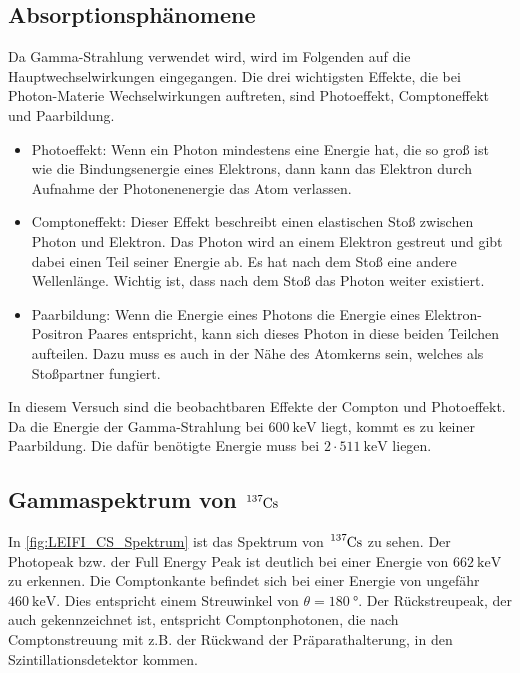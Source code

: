 \subsection{Absorptionsphänomene}
Da Gamma-Strahlung verwendet wird, wird im Folgenden auf die Hauptwechselwirkungen eingegangen.
Die drei wichtigsten Effekte, die bei Photon-Materie Wechselwirkungen auftreten, sind Photoeffekt, Comptoneffekt und Paarbildung.
\begin{itemize}
    \item   Photoeffekt: Wenn ein Photon mindestens eine Energie hat, die so groß ist wie die Bindungsenergie eines Elektrons, dann kann das Elektron durch Aufnahme der Photonenenergie das Atom verlassen.
    
    \item   Comptoneffekt: Dieser Effekt beschreibt einen elastischen Stoß zwischen Photon und Elektron.
            Das Photon wird an einem Elektron gestreut und gibt dabei einen Teil seiner Energie ab.
            Es hat nach dem Stoß eine andere Wellenlänge. Wichtig ist, dass nach dem Stoß das Photon weiter existiert.
    
    \item   Paarbildung: Wenn die Energie eines Photons die Energie eines Elektron-Positron Paares entspricht, kann sich dieses Photon in diese beiden Teilchen aufteilen.
            Dazu muss es auch in der Nähe des Atomkerns sein, welches als Stoßpartner fungiert. 
    
\end{itemize}

\noindent
In diesem Versuch sind die beobachtbaren Effekte der Compton und Photoeffekt.
Da die Energie der Gamma-Strahlung bei $\SI{600}{\kilo\electronvolt}$ liegt, kommt es zu keiner Paarbildung.
Die dafür benötigte Energie muss bei $2 \cdot \SI{511}{\kilo\electronvolt}$ liegen.

\subsection{Gammaspektrum von $\ce{^{137}Cs}$}
In \autoref{fig:LEIFI_CS_Spektrum} ist das Spektrum von $\ce{^{137}Cs}$ zu sehen.
Der Photopeak bzw. der Full Energy Peak ist deutlich bei einer Energie von $\SI{662}{\kilo\electronvolt}$ zu erkennen. 
Die Comptonkante befindet sich bei einer Energie von ungefähr $\SI{460}{\kilo\electronvolt}$. Dies 
entspricht einem Streuwinkel von $\theta = \SI{180}{\degree}$. Der Rückstreupeak, der auch gekennzeichnet ist, 
entspricht Comptonphotonen, die nach Comptonstreuung mit z.B. der Rückwand der Präparathalterung, in den Szintillationsdetektor kommen.  

